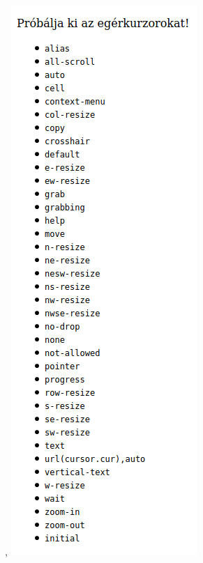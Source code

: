 \begin{frame}
\begin{columns}[c]
\begin{exampleblock}{, }
        \includegraphics[width=.8\textwidth]{kurzor.png}
      \end{exampleblock}
  \end{columns}
\end{frame}
